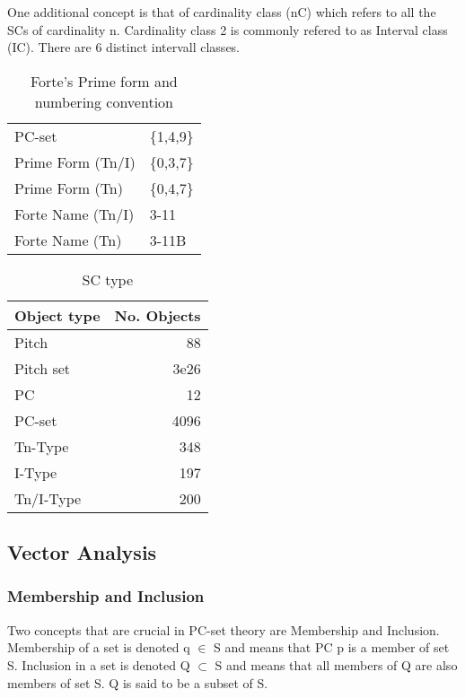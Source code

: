\documentclass{article}
\begin{document}
One additional concept is that of cardinality class (nC) which refers
to all the SCs of cardinality n. Cardinality class 2 is commonly
refered to as Interval class (IC). There are 6 distinct intervall
classes.

\begin{table}[htb]
\caption{Forte's Prime form and numbering convention} 
\begin{center}
\begin{tabular}{ll}
 PC-set             &  \{1,4,9\}  \\
 Prime Form (Tn/I)  &  \{0,3,7\}  \\
 Prime Form (Tn)    &  \{0,4,7\}  \\
 Forte Name (Tn/I)  &  3-11       \\
 Forte Name (Tn)    &  3-11B      \\
\end{tabular}
\end{center}
\end{table}


\begin{table}[htb]
\caption{SC type} 
\begin{center}
\begin{tabular}{lr}
 Object type  &  No. Objects  \\
\hline
 Pitch        &           88  \\
 Pitch set    &         3e26  \\
 PC           &           12  \\
 PC-set       &         4096  \\
 Tn-Type      &          348  \\
 I-Type       &          197  \\
 Tn/I-Type    &          200  \\
\end{tabular}
\end{center}
\end{table}
\subsection{Vector Analysis}
\label{sec-3-3}
\subsubsection{Membership and Inclusion}
\label{sec-3-3-1}

Two concepts that are crucial in PC-set theory are Membership and
Inclusion. Membership of a set is denoted q $\in$ S and means that PC p
is a member of set S. Inclusion in a set is denoted Q $\subset$ S and
means that all members of Q are also members of set S. Q is said to be
a subset of S.
\end{document}
